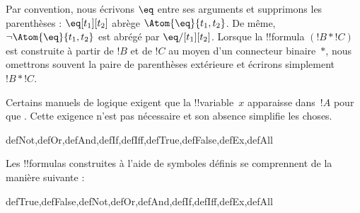 \documentclass[../../../include/open-logic-section]{subfiles}
\begin{document}
Par convention, nous écrivons $\eq$ entre ses arguments et supprimons
les parenthèses : $\eq[t_1][t_2]$ abrège
$\Atom{\eq}{t_1,t_2}$. De même, $\lnot \Atom{\eq}{t_1,t_2}$
est abrégé par $\eq/[t_1][t_2]$. Lorsque la !!{formula}
$(!B \ast !C)$ est construite à partir de $!B$ et de $!C$ au moyen
d'un connecteur binaire~$\ast$, nous omettrons souvent la paire de
parenthèses extérieure et écrirons simplement~$!B \ast !C$.

\begin{intro}
Certains manuels de logique exigent que la !!{variable}~$x$ apparaisse
dans~$!A$ pour que
%
%
%
. Cette exigence n'est pas
nécessaire et son absence simplifie les choses.
\end{intro}

\begin{tagblock}{defNot,defOr,defAnd,defIf,defIff,defTrue,defFalse,defEx,defAll}
\begin{defn}
Les !!{formula}s construites à l'aide de symboles définis se
comprennent de la manière suivante :

\begin{tagenumerate}{defTrue,defFalse,defNot,defOr,defAnd,defIf,defIff,defEx,defAll}









\end{tagenumerate}
\end{defn}
\end{tagblock}
\end{document}
